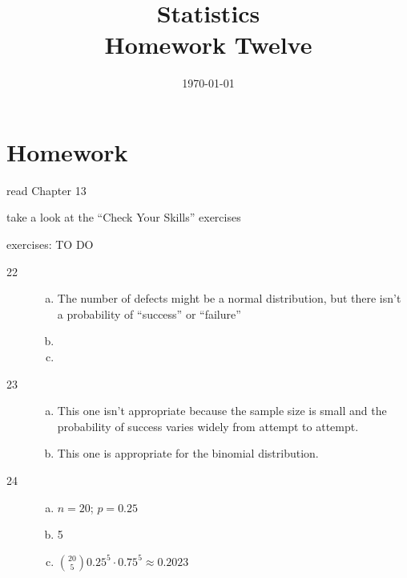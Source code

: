 \documentclass[letterpaper, landscape]{exam}
\title{Statistics \\ Homework Twelve}
\date{\today}
\author{}
\begin{document}
  \maketitle

  \section{Homework}
  \ifprintanswers
  \else
    \begin{itemize*}
      \item read Chapter 13 
      \item take a look at the ``Check Your Skills'' exercises
      \item exercises: TO DO
    \end{itemize*}
  \fi

  \ifprintanswers
    \begin{description}

      \item[22] 
        \begin{enumerate}[(a)]
          \item {}
            The number of defects might be a normal distribution, but there
            isn't a probability of ``success'' or ``failure''

          \item {}

          \item {}
        \end{enumerate}

      \item[23]
        \begin{enumerate}[(a)]
          \item This one isn't appropriate because the sample size is small and
            the probability of success varies widely from attempt to attempt.

          \item This one is appropriate for the binomial distribution.
        \end{enumerate}

      \item[24]
        \begin{enumerate}[(a)]
          \item $n = 20$; $p = 0.25$
          \item 5
          \item $ \binom{20}{5} 0.25^5 \cdot 0.75^5 \approx \boxed{ 0.2023 } $
        \end{enumerate}


\end{description}
\end{document}

